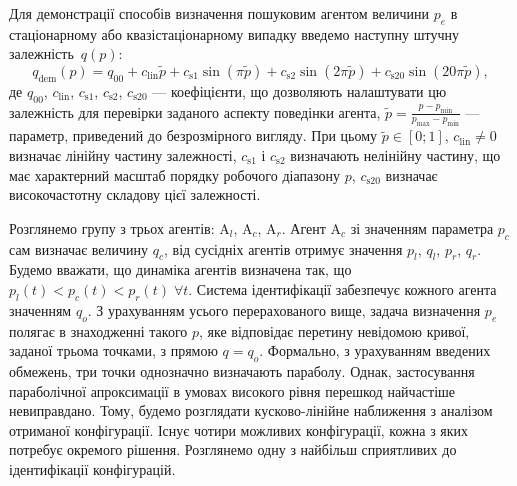 \documentclass[a4paper,13pt]{atuaref}
\begin{document}
Для демонстрації способів визначення пошуковим агентом величини $p_e$ в
стаціонарному або квазістаціонарному випадку введемо наступну штучну залежність~$q(p)$:
%
\begin{equation}
  q_\mathrm{dem}(p) = q_{00} + c_\mathrm{lin} \tilde{p} + c_\mathrm{s1} \sin( \pi \tilde{p} ) + c_\mathrm{s2} \sin( 2 \pi \tilde{p} ) + c_\mathrm{s20} \sin( 20 \pi \tilde{p} ),
  \label{atu:eq:q_dem}
\end{equation}
%
де $q_{00}$, $c_\mathrm{lin}$, $c_\mathrm{s1}$, $c_\mathrm{s2}$, $c_\mathrm{s20}$
---
коефіцієнти, що дозволяють налаштувати цю залежність для перевірки заданого аспекту поведінки агента,
$\tilde{p} = \frac{p - p_{\min}}{p_{\max} - p_{\min}}$
---
параметр, приведений до безрозмірного вигляду.
При цьому $\tilde{p} \in[0;1]$, $c_\mathrm{lin} \ne 0$
визначає лінійну частину залежності,
$c_\mathrm{s1}$ і $c_\mathrm{s2}$
визначають нелінійну частину, що має характерний масштаб порядку робочого діапазону $p$,
$c_\mathrm{s20}$ визначає високочастотну складову цієї залежності.

%
%


Розглянемо групу з трьох агентів:
$\mathrm{A}_l$,
$\mathrm{A}_c$,
$\mathrm{A}_r$.
%
Агент $\mathrm {A} _c$ зі значенням параметра $p_c$ сам визначає величину
$q_c$, від сусідніх агентів отримує значення $p_l$, $q_l$, $p_r$, $q_r$.
Будемо вважати, що динаміка агентів визначена так, що
$p_l(t) < p_c (t) < p_r(t) \; \forall t$.
Система ідентифікації забезпечує кожного агента
значенням $q_o$. З урахуванням усього перерахованого вище, задача
визначення $p_e$ полягає в знаходженні такого $p$, яке відповідає перетину
невідомою кривої, заданої трьома точками, з прямою $q = q_o$.
Формально, з урахуванням введених обмежень, три точки однозначно визначають параболу. Однак,
застосування параболічної апроксимації в умовах високого рівня перешкод
найчастіше невиправдано.
Тому, будемо розглядати кусково-лінійне наближення з
аналізом отриманої конфігурації. Існує чотири можливих конфігурації,
кожна з яких потребує окремого рішення. Розглянемо одну з найбільш
сприятливих до ідентифікації конфігурацій.
\end{document}
